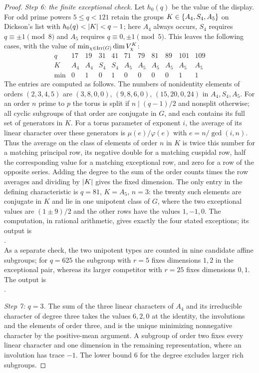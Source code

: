 \begin{proof}
\emph{Step 6: the finite exceptional check.} Let $h_0(q)$ be the value of the
display. For odd prime powers $5\le q<121$ retain the groups
$K\in\{A_4,S_4,A_5\}$ on Dickson's list with $h_0(q)<\lvert K\rvert<q-1$; here $A_4$
always occurs, $S_4$ requires $q\equiv\pm1\pmod8$ and $A_5$ requires
$q\equiv0,\pm1\pmod5$. This leaves the following cases, with the value of
$\min_{\chi\in\operatorname{Irr}(G)}\dim V_\chi^K$:
\[
\begin{array}{c|rrrrrrrrrr}
q&17&19&31&41&71&79&81&89&101&109\\\hline
K&A_4&A_4&S_4&S_4&A_5&A_5&A_5&A_5&A_5&A_5\\
\min&0&1&0&1&0&0&0&0&1&1
\end{array}
\]
The entries are computed as follows. The numbers of nonidentity elements of
orders $(2,3,4,5)$ are $(3,8,0,0)$, $(9,8,6,0)$, $(15,20,0,24)$ in
$A_4,S_4,A_5$. For an order $n$ prime to $p$ the torus is split if
$n\mid(q-1)/2$ and nonsplit otherwise; all cyclic subgroups of that order are
conjugate in $G$, and each contains its full set of generators in $K$. For a
torus parameter of exponent $i$, the average of its linear character over
these generators is $\mu(e)/\varphi(e)$ with $e=n/\gcd(i,n)$. Thus the average
on the class of elements of order $n$ in $K$ is twice this number for a
matching principal row, its negative double for a matching cuspidal row, half
the corresponding value for a matching exceptional row, and zero for a row of
the opposite series. Adding the degree to the sum of the order counts times
the row averages and dividing by $\lvert K\rvert$ gives the fixed dimension. The only
entry in the defining characteristic is $q=81$, $K=A_5$, $n=3$: the twenty
such elements are conjugate in $K$ and lie in one unipotent class of $G$,
where the two exceptional values are $(1\pm9)/2$ and the other rows have the
values $1,-1,0$. The computation, in rational arithmetic, gives exactly the
four stated exceptions; its output is\\
{\small{}}.\\
As a separate check, the two unipotent types are counted in nine candidate
affine subgroups; for $q=625$ the subgroup with $r=5$ fixes dimensions $1,2$
in the exceptional pair, whereas its larger competitor with $r=25$ fixes
dimensions $0,1$. The output is\\
{\small{}}.

\emph{Step 7: $q=3$.} The sum of the three linear characters of $A_4$ and its
irreducible character of degree three takes the values $6,2,0$ at the
identity, the involutions and the elements of order three, and is the unique
minimizing nonnegative character by the positive-mean argument. A subgroup of
order two fixes every linear character and one dimension in the remaining
representation, where an involution has trace $-1$. The lower bound $6$ for
the degree excludes larger rich subgroups.
\end{proof}

